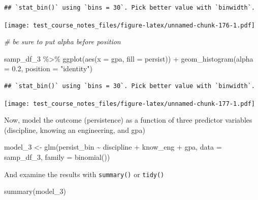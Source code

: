 \documentclass[
]{book}
\newenvironment{Shaded}{\begin{snugshade}}{\end{snugshade}}
\newcommand{\AttributeTok}[1]{\textcolor[rgb]{0.77,0.63,0.00}{#1}}
\newcommand{\CommentTok}[1]{\textcolor[rgb]{0.56,0.35,0.01}{\textit{#1}}}
\newcommand{\FloatTok}[1]{\textcolor[rgb]{0.00,0.00,0.81}{#1}}
\newcommand{\FunctionTok}[1]{\textcolor[rgb]{0.00,0.00,0.00}{#1}}
\newcommand{\NormalTok}[1]{#1}
\newcommand{\OtherTok}[1]{\textcolor[rgb]{0.56,0.35,0.01}{#1}}
\newcommand{\SpecialCharTok}[1]{\textcolor[rgb]{0.00,0.00,0.00}{#1}}
\newcommand{\StringTok}[1]{\textcolor[rgb]{0.31,0.60,0.02}{#1}}
\begin{document}
\begin{verbatim}
## `stat_bin()` using `bins = 30`. Pick better value with `binwidth`.
\end{verbatim}

\texttt{[image: test\_course\_notes\_files/figure-latex/unnamed-chunk-176-1.pdf]}

\begin{Shaded}
\begin{Highlighting}[]
\CommentTok{\# be sure to put alpha before position}
\end{Highlighting}
\end{Shaded}

\begin{Shaded}
\begin{Highlighting}[]
\NormalTok{samp\_df\_3 }\SpecialCharTok{\%\textgreater{}\%} 
  \FunctionTok{ggplot}\NormalTok{(}\FunctionTok{aes}\NormalTok{(}\AttributeTok{x =}\NormalTok{ gpa, }\AttributeTok{fill =}\NormalTok{ persist)) }\SpecialCharTok{+}
  \FunctionTok{geom\_histogram}\NormalTok{(}\AttributeTok{alpha =} \FloatTok{0.2}\NormalTok{, }\AttributeTok{position =} \StringTok{"identity"}\NormalTok{)}
\end{Highlighting}
\end{Shaded}

\begin{verbatim}
## `stat_bin()` using `bins = 30`. Pick better value with `binwidth`.
\end{verbatim}

\texttt{[image: test\_course\_notes\_files/figure-latex/unnamed-chunk-177-1.pdf]}

Now, model the outcome (persistence) as a function of three predictor variables (discipline, knowing an engineering, and gpa)

\begin{Shaded}
\begin{Highlighting}[]
\NormalTok{model\_3 }\OtherTok{\textless{}{-}} \FunctionTok{glm}\NormalTok{(persist\_bin }\SpecialCharTok{\textasciitilde{}}\NormalTok{ discipline }\SpecialCharTok{+}\NormalTok{ know\_eng }\SpecialCharTok{+}\NormalTok{ gpa, }\AttributeTok{data =}\NormalTok{ samp\_df\_3, }\AttributeTok{family =} \FunctionTok{binomial}\NormalTok{())}
\end{Highlighting}
\end{Shaded}

And examine the results with \texttt{summary()} or \texttt{tidy()}

\begin{Shaded}
\begin{Highlighting}[]
\FunctionTok{summary}\NormalTok{(model\_3)}
\end{Highlighting}
\end{Shaded}
\end{document}
